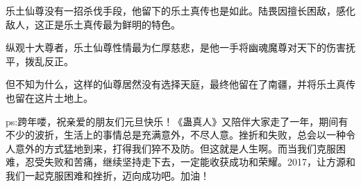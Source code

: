 \begin{this_body}
乐土仙尊没有一招杀伐手段，他留下的乐土真传也是如此。陆畏因擅长困敌，感化敌人，这正是乐土真传最为鲜明的特色。

纵观十大尊者，乐土仙尊性情最为仁厚慈悲，是他一手将幽魂魔尊对天下的伤害抚平，拨乱反正。

但不知为什么，这样的仙尊居然没有选择天庭，最终他留在了南疆，并将乐土真传也留在这片土地上。

ps:跨年喽，祝亲爱的朋友们元旦快乐！《蛊真人》又陪伴大家走了一年，期间有不少的波折，生活上的事情总是充满意外，不尽人意。挫折和失败，总会以一种令人意外的方式猛地到来，打得我们猝不及防。但这就是人生啊。而当我们克服困难，忍受失败和苦痛，继续坚持走下去，一定能收获成功和荣耀。2017，让方源和我们一起克服困难和挫折，迈向成功吧。加油！

\end{this_body}

